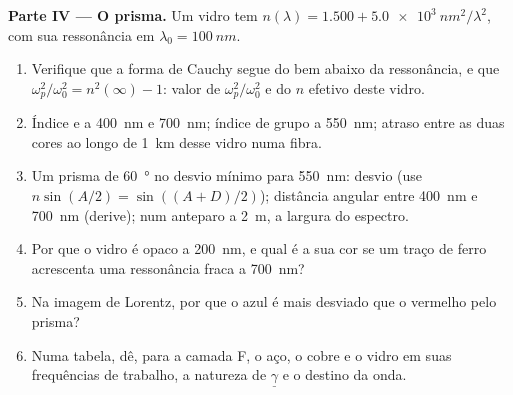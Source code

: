 \begin{problem}
\medskip
\noindent\textbf{Parte IV --- O prisma.}
Um vidro tem $n(\lambda) = 1.500 + \qty{5.0e3}{nm^2}/\lambda^2$, com sua ressonância
em $\lambda_0 = \qty{100}{nm}$.
\begin{enumerate}[resume]
  \item Verifique que a forma de Cauchy segue do  bem
        abaixo da ressonância, e que $\omega_p^2/\omega_0^2 = n^2(\infty) - 1$: valor
        de $\omega_p^2/\omega_0^2$ e do $n$ efetivo deste vidro.
  \item Índice e  a \qty{400}{nm} e \qty{700}{nm}; índice
        de grupo a \qty{550}{nm}; atraso entre as duas cores ao longo de
        \qty{1}{km} desse vidro numa fibra.
  \item Um prisma de \qty{60}{\degree} no desvio mínimo para \qty{550}{nm}:
        desvio (use $n\sin(A/2) = \sin((A + D)/2)$); distância angular
        entre \qty{400}{nm} e \qty{700}{nm} (derive); num anteparo
        a \qty{2}{m}, a largura do espectro.
  \item Por que o vidro é opaco a \qty{200}{nm}, e qual é a sua
        cor se um traço de ferro acrescenta uma ressonância fraca a \qty{700}{nm}?
  \item Na imagem de Lorentz, por que o azul é mais desviado que o vermelho pelo
        prisma?
  \item Numa tabela, dê, para a camada F, o aço, o cobre e
        o vidro em suas frequências de trabalho, a natureza de
        $\underline\gamma$ e o destino da onda.
\end{enumerate}
\end{problem}
